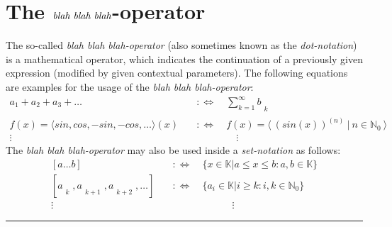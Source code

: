 \documentclass[pdftex,12pt,a4paper]{report}
\begin{document}
    \section{The $ \emph{blah blah blah} $-operator}
    The so-called \emph{blah blah blah-operator} (also sometimes known as the \emph{dot-notation}) is a mathematical operator, which indicates the continuation of a previously given expression (modified by given contextual parameters). The following equations are examples for the usage of the \emph{blah blah blah-operator}:
    \begin{equation*}
        \begin{aligned}
            a_1 + a_2 + a_3 + \ldots \quad & :\Longleftrightarrow \quad \sum_{k=1}^{ \infty } b_{\substack{\\k}}
            \\
            f(x) = \langle sin, cos, -sin, -cos, \ldots \rangle (x) \quad & :\Longleftrightarrow \quad f(x) = \langle \ (sin(x))^{(n)}\ |\ n \in \mathbb{N}_0 \ \rangle
            \\
            \vdots \qquad \qquad & \qquad \qquad \vdots
        \end{aligned}
    \end{equation*}
    The \emph{blah blah blah-operator} may also be used inside a \emph{set-notation} as follows:
    \begin{equation*}
        \begin{aligned}
            [a \ldots b] \quad & :\Longleftrightarrow \quad \{ x \in \mathbb{K} | a \leq x \leq b : a,b \in \mathbb{K} \}
            \\
            [a_{\substack{\\k}}, a_{\substack{\\k+1}}, a_{\substack{\\k+2}}, \ldots] \quad & :\Longleftrightarrow \quad \{ a_i \in \mathbb{K} | i \geq k : i,k \in \mathbb{N}_0 \}
            \\
            \vdots \quad \quad & \qquad \qquad \qquad \vdots
        \end{aligned}
    \end{equation*}
    \vspace{5mm} \hrule
\end{document}
